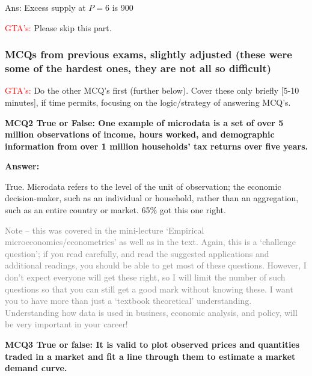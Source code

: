 \documentclass[]{article}
\begin{document}
Ans: Excess supply at \(P=6\) is 900

\textcolor{red}{GTA's:} Please skip this part.

\hypertarget{mcqs-from-previous-exams-slightly-adjusted-these-were-some-of-the-hardest-ones-they-are-not-all-so-difficult}{%
\subsubsection*{MCQs from previous exams, slightly adjusted (these were
some of the hardest ones, they are not all so
difficult)}\label{mcqs-from-previous-exams-slightly-adjusted-these-were-some-of-the-hardest-ones-they-are-not-all-so-difficult}}

\textcolor{red}{GTA's:} Do the other MCQ's first (further below). Cover
these only briefly {[}5-10 minutes{]}, if time permits, focusing on the
logic/strategy of answering MCQ's.

\textbf{MCQ2 True or False: One example of microdata is a set of over 5
million observations of income, hours worked, and demographic
information from over 1 million households' tax returns over five
years.}

\bigskip

\textbf{Answer:}

True. Microdata refers to the level of the unit of observation; the
economic decision-maker, such as an individual or household, rather than
an aggregation, such as an entire country or market. 65\% got this one
right.

\textcolor{gray}{Note – this was covered in the mini-lecture ‘Empirical microeconomics/econometrics’ as well as in the text. Again, this is a ‘challenge question’; if you read carefully, and read the suggested applications and additional readings, you should be able to get most of these questions. However, I don’t expect everyone will get these right, so I will limit the number of such questions so that you can still get a good mark without knowing these.
I want you to have more than just a ‘textbook theoretical’ understanding. Understanding how data is used in business, economic analysis, and policy, will be very important in your career!}

\bigskip

\textbf{MCQ3 True or false: It is valid to plot observed prices and
quantities traded in a market and fit a line through them to estimate a
market demand curve.}
\end{document}
